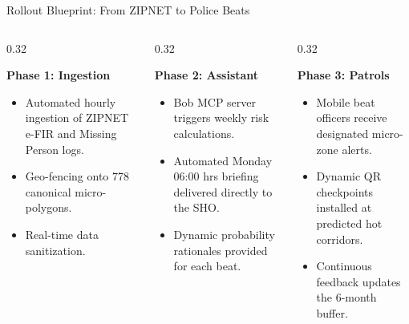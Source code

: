 \documentclass[aspectratio=169,10pt]{beamer}
\begin{document}
\begin{frame}{Rollout Blueprint: From ZIPNET to Police Beats}
  \begin{columns}[T]
    \begin{column}{0.32\textwidth}
      \begin{block}{\textbf{Phase 1: Ingestion}}
        \footnotesize
        \begin{itemize}\itemsep=0.2em
          \item Automated hourly ingestion of ZIPNET e-FIR and Missing Person logs.
          \item Geo-fencing onto 778 canonical micro-polygons.
          \item Real-time data sanitization.
        \end{itemize}
      \end{block}
    \end{column}

    \begin{column}{0.32\textwidth}
      \begin{block}{\textbf{Phase 2: Assistant}}
        \footnotesize
        \begin{itemize}\itemsep=0.2em
          \item Bob MCP server triggers weekly risk calculations.
          \item Automated Monday 06:00 hrs briefing delivered directly to the SHO.
          \item Dynamic probability rationales provided for each beat.
        \end{itemize}
      \end{block}
    \end{column}

    \begin{column}{0.32\textwidth}
      \begin{block}{\textbf{Phase 3: Patrols}}
        \footnotesize
        \begin{itemize}\itemsep=0.2em
          \item Mobile beat officers receive designated micro-zone alerts.
          \item Dynamic QR checkpoints installed at predicted hot corridors.
          \item Continuous feedback updates the 6-month buffer.
        \end{itemize}
      \end{block}
    \end{column}
  \end{columns}


\end{frame}
\end{document}
